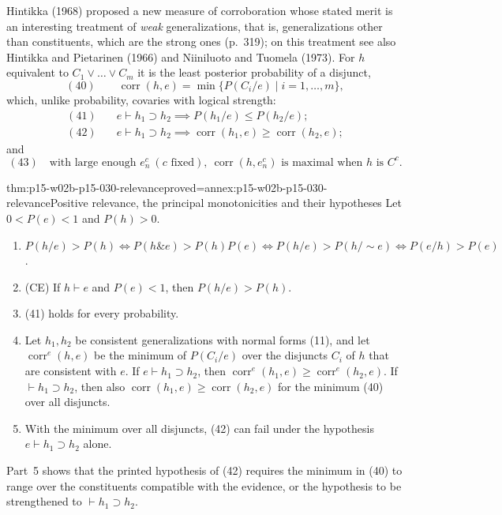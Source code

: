 Hintikka (1968) proposed a new measure of corroboration whose stated
merit is an interesting treatment of \emph{weak} generalizations, that
is, generalizations other than constituents, which are the strong ones
(p.~319); on this treatment see also Hintikka and Pietarinen (1966) and
Niiniluoto and Tuomela (1973). For \(h\) equivalent to
\(C_1\lor\ldots\lor C_m\) it is the least posterior probability of a
disjunct,
\[
 (40)\qquad \operatorname{corr}(h,e)=\min\{P(C_i/e)\mid i=1,\ldots,m\},
\]
which, unlike probability, covaries with logical strength:
\[
\begin{aligned}
 (41)&\quad e\vdash h_1\supset h_2\implies P(h_1/e)\leq P(h_2/e);\\
 (42)&\quad e\vdash h_1\supset h_2\implies \operatorname{corr}(h_1,e)\geq\operatorname{corr}(h_2,e);
\end{aligned}
\]
and
\[
 (43)\quad\text{with large enough }e^c_n\ (c\text{ fixed}),\ \operatorname{corr}(h,e^c_n)
 \text{ is maximal when }h\text{ is }C^c.
\]
\cite[pp.~332--333]{Niiniluoto2011HintikkaProgramReading}

\begin{hbtheorem}{thm:p15-w02b-p15-030-relevance}{proved=annex:p15-w02b-p15-030-relevance}{Positive relevance, the principal monotonicities and their hypotheses}
Let \(0<P(e)<1\) and \(P(h)>0\).
\begin{enumerate}
\item \(P(h/e)>P(h)\iff P(h\&e)>P(h)P(e)\iff P(h/e)>P(h/\sim e)\iff
  P(e/h)>P(e)\).
\item (CE) If \(h\vdash e\) and \(P(e)<1\), then \(P(h/e)>P(h)\).
\item (41) holds for every probability.
\item Let \(h_1,h_2\) be consistent generalizations with normal forms
  (11), and let \(\operatorname{corr}^e(h,e)\) be the minimum of
  \(P(C_i/e)\) over the disjuncts \(C_i\) of \(h\) that are consistent with
  \(e\). If \(e\vdash h_1\supset h_2\), then
  \(\operatorname{corr}^e(h_1,e)\geq\operatorname{corr}^e(h_2,e)\). If
  \(\vdash h_1\supset h_2\), then also
  \(\operatorname{corr}(h_1,e)\geq\operatorname{corr}(h_2,e)\) for the
  minimum (40) over all disjuncts.
\item With the minimum over all disjuncts, (42) can fail under the
  hypothesis \(e\vdash h_1\supset h_2\) alone.
\end{enumerate}
\end{hbtheorem}

Part~5 shows that the printed hypothesis of (42) requires the minimum in
(40) to range over the constituents compatible with the evidence, or the
hypothesis to be strengthened to \(\vdash h_1\supset h_2\).

